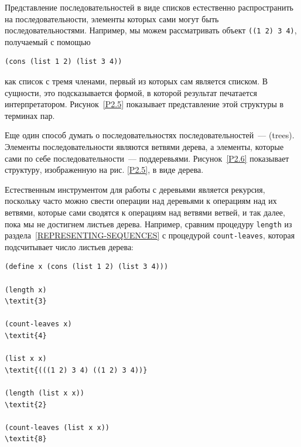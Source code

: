 Представление последовательностей в виде списков
естественно распространить на последовательности, элементы которых сами
могут быть последовательностями.  Например, мы можем рассматривать
объект {\tt ((1 2) 3 4)}, получаемый с помощью

\begin{Verbatim}[fontsize=\small]
(cons (list 1 2) (list 3 4))
\end{Verbatim}
как список с тремя членами, первый из которых сам является списком.  В 
сущности, это подсказывается формой, в которой результат печатается
интерпретатором.  Рисунок~\ref{P2.5} показывает
представление этой структуры в терминах пар.


\begin{cntrfig}

\caption{Структура, формируемая {\tt (cons (list 1 2) (list 3 4))}}
\label{P2.5}

\end{cntrfig}

Еще один способ думать о последовательностях
последовательностей~---  (trees).  Элементы 
последовательности являются ветвями дерева, а элементы, которые сами
по себе последовательности~--- поддеревьями. Рисунок~\ref{P2.6} показывает структуру, изображенную на
рис. \ref{P2.5}, в виде дерева.



Естественным инструментом для работы с деревьями является
рекурсия, поскольку часто можно свести операции над деревьями к
операциям над их ветвями, которые сами сводятся к операциям над
ветвями ветвей, и так далее, пока мы не достигнем листьев дерева.
Например, сравним процедуру {\tt length} из раздела~\ref{REPRESENTING-SEQUENCES} с процедурой
{\tt count-leaves}, которая подсчитывает число листьев
дерева:


\begin{Verbatim}[fontsize=\small]
(define x (cons (list 1 2) (list 3 4)))

(length x)
\textit{3}

(count-leaves x)
\textit{4}

(list x x)
\textit{(((1 2) 3 4) ((1 2) 3 4))}

(length (list x x))
\textit{2}

(count-leaves (list x x))
\textit{8}
\end{Verbatim}


